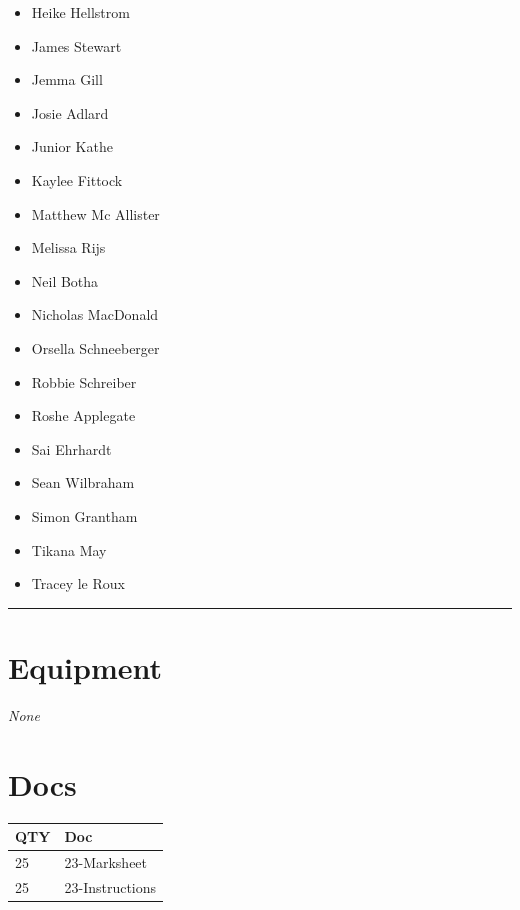 \documentclass[10pt, A5]{article}
\begin{document}
\begin{framed}
\begin{minipage}{\textwidth}
\begin{multicols}{2}
		\vfill\null
		\columnbreak

		\begin{itemize}
									\item Heike Hellstrom
									\item James Stewart
									\item Jemma Gill
									\item Josie Adlard
									\item Junior Kathe
									\item Kaylee Fittock
									\item Matthew Mc Allister
									\item Melissa Rijs
									\item Neil Botha
									\item Nicholas MacDonald
									\item Orsella Schneeberger
									\item Robbie Schreiber
									\item Roshe Applegate
									\item Sai Ehrhardt
									\item Sean Wilbraham
									\item Simon Grantham
									\item Tikana May
									\item Tracey le Roux
						\end{itemize}

		\vfill\null

		\end{multicols}

    \vspace{0.25cm}
        \hrule
        \vspace{0.25cm}

        \begin{multicols}{2}

		\section*{\faWrench \: Equipment}

				\textit{None}
		
		\vfill\null
		\columnbreak

			\section*{\faFile \: Docs}
		 	\begin{center}
			\begin{tabular}{p{2cm}p{4cm}}

			\textbf{QTY} & \textbf{Doc} \\\toprule
										25&23-Marksheet\\\midrule
										25&23-Instructions\\\midrule
							\end{tabular}
			\end{center}
	

		\vfill\null

		\end{multicols}
\end{minipage}
\end{framed}
\end{document}
